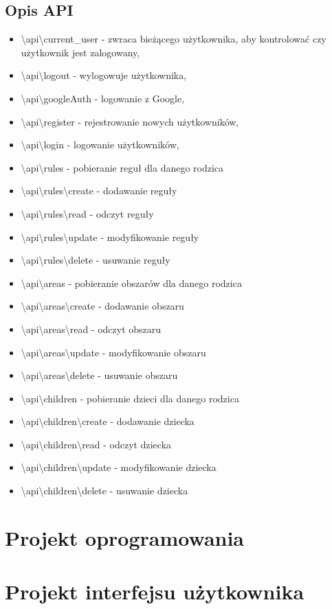 \documentclass{sprawozdanie-agh}
\begin{document}
		\subsection{Opis API}
		\begin{itemize}
			\item \textbackslash api\textbackslash current\_user - zwraca bieżącego użytkownika, aby kontrolować czy użytkownik jest zalogowany,
			\item \textbackslash api\textbackslash logout - wylogowuje użytkownika,
			\item \textbackslash api\textbackslash googleAuth - logowanie z Google,
			\item \textbackslash api\textbackslash register - rejestrowanie nowych użytkowników,
			\item \textbackslash api\textbackslash login - logowanie użytkowników,
			
			\item \textbackslash api\textbackslash rules - pobieranie reguł dla danego rodzica
			\item \textbackslash api\textbackslash rules\textbackslash create - dodawanie reguły
			\item \textbackslash api\textbackslash rules\textbackslash read - odczyt reguły
			\item \textbackslash api\textbackslash rules\textbackslash update - modyfikowanie reguły
			\item \textbackslash api\textbackslash rules\textbackslash delete - usuwanie reguły
			
			\item \textbackslash api\textbackslash areas - pobieranie obszarów dla danego rodzica
			\item \textbackslash api\textbackslash areas\textbackslash create - dodawanie obszaru
			\item \textbackslash api\textbackslash areas\textbackslash read - odczyt obszaru
			\item \textbackslash api\textbackslash areas\textbackslash update - modyfikowanie obszaru
			\item \textbackslash api\textbackslash areas\textbackslash delete - usuwanie obszaru
			
			\item \textbackslash api\textbackslash children - pobieranie dzieci dla danego rodzica
			\item \textbackslash api\textbackslash children\textbackslash create - dodawanie dziecka
			\item \textbackslash api\textbackslash children\textbackslash read - odczyt dziecka
			\item \textbackslash api\textbackslash children\textbackslash update - modyfikowanie dziecka
			\item \textbackslash api\textbackslash children\textbackslash delete - usuwanie dziecka
			
		\end{itemize}
		

	\section{Projekt oprogramowania}
	
		

	\section{Projekt interfejsu użytkownika}
\end{document}
